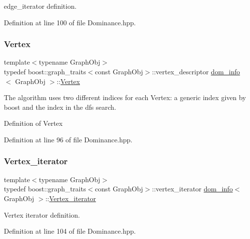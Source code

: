 edge\+\_\+iterator definition. 



Definition at line 100 of file Dominance.\+hpp.

\mbox{\label{classdom__info_a5e4ca21e2c5281bdbb95d2c8d965c9be}} 
\subsubsection{\texorpdfstring{Vertex}{Vertex}}
{\footnotesize\ttfamily template$<$typename Graph\+Obj$>$ \\
typedef boost\+::graph\+\_\+traits$<$const Graph\+Obj$>$\+::vertex\+\_\+descriptor \hyperlink{classdom__info}{dom\+\_\+info}$<$ Graph\+Obj $>$\+::\hyperlink{classdom__info_a5e4ca21e2c5281bdbb95d2c8d965c9be}{Vertex}\hspace{0.3cm}{\ttfamily [private]}}



The algorithm uses two different indices for each Vertex\+: a generic index given by boost and the index in the dfs search. 

Definition of Vertex 

Definition at line 96 of file Dominance.\+hpp.

\mbox{\label{classdom__info_aeb973e792e54d415b4c81524f85aee80}} 
\subsubsection{\texorpdfstring{Vertex\+\_\+iterator}{Vertex\_iterator}}
{\footnotesize\ttfamily template$<$typename Graph\+Obj$>$ \\
typedef boost\+::graph\+\_\+traits$<$const Graph\+Obj$>$\+::vertex\+\_\+iterator \hyperlink{classdom__info}{dom\+\_\+info}$<$ Graph\+Obj $>$\+::\hyperlink{classdom__info_aeb973e792e54d415b4c81524f85aee80}{Vertex\+\_\+iterator}\hspace{0.3cm}{\ttfamily [private]}}



Vertex iterator definition. 



Definition at line 104 of file Dominance.\+hpp.



